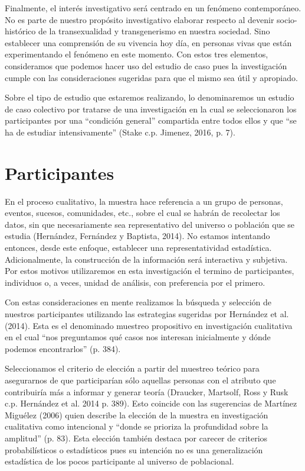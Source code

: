 Finalmente, el interés investigativo será centrado en un fenómeno contemporáneo.
No es parte de nuestro propósito investigativo elaborar respecto al devenir
socio-histórico de la transexualidad y transgenerismo en nuestra sociedad.
Sino establecer una comprensión de su vivencia hoy día, en personas vivas que
están experimentando el fenómeno en este momento.
Con estos tres elementos, consideramos que podemos hacer uso del estudio de caso
pues la investigación cumple con las consideraciones sugeridas para que el mismo
sea útil y apropiado.

Sobre el tipo de estudio que estaremos realizando, lo denominaremos un estudio
de caso colectivo por tratarse de una investigación en la cual se seleccionaron
los participantes por una “condición general” compartida entre todos ellos y que
“se ha de estudiar intensivamente” (Stake c.p. Jimenez, 2016, p. 7).

\section{Participantes}
En el proceso cualitativo, la muestra hace referencia a un grupo de personas,
eventos, sucesos, comunidades, etc., sobre el cual se habrán de recolectar los
datos, sin que necesariamente sea representativo del universo o población que se
estudia (Hernández, Fernández y Baptista, 2014).
No estamos intentando entonces, desde este enfoque, establecer una
representatividad estadística.
Adicionalmente, la construcción de la información será interactiva y subjetiva.
Por estos motivos utilizaremos en esta investigación el termino de
participantes, individuos o, a veces, unidad de análisis, con preferencia por el
primero.

Con estas consideraciones en mente realizamos la búsqueda y selección de
nuestros participantes utilizando las estrategias sugeridas por Hernández et al.
(2014).
Esta es el denominado muestreo propositivo en investigación cualitativa en el
cual “nos preguntamos qué casos nos interesan inicialmente y dónde podemos
encontrarlos” (p. 384).

Seleccionamos el criterio de elección a partir del muestreo teórico para
asegurarnos de que participarían sólo aquellas personas con el atributo que
contribuiría más a informar y generar teoría (Draucker, Martsolf, Ross y Rusk
c.p. Hernández et al. 2014 p. 389).
Esto coincide con las sugerencias de Martínez Miguélez (2006) quien describe la
elección de la muestra en investigación cualitativa como intencional y “donde se
prioriza la profundidad sobre la amplitud” (p. 83).
Esta elección también destaca por carecer de criterios probabilísticos o
estadísticos pues su intención no es una generalización estadística de los pocos
participante al universo de poblacional.

